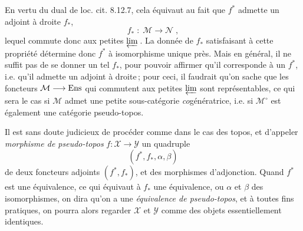 En vertu du dual de loc. cit. 8.12.7, cela équivaut au fait que $f^*$ admette un adjoint à droite $f_*$,
\[
f_* \;:\; \mathcal{M} \longrightarrow \mathcal{N}\;,
\tag*{(4.1.2)}
\]
lequel commute donc aux petites $\varprojlim$\,. La donnée de $f_*$ satisfaisant à cette propriété détermine donc $f^*$ à isomorphisme unique près. Mais en général, il ne suffit pas de se donner un tel $f_*$, pour pouvoir affirmer qu'il corresponde à un $f^*$, i.e. qu'il admette un adjoint à droite\,; pour ceci, il faudrait qu'on sache que les foncteurs $\mathcal{M}\longrightarrow\mathrm{Ens}$ qui commutent aux petites $\varprojlim$ sont représentables, ce qui sera le cas si $\mathcal{M}$ admet une petite sous-catégorie \textit{co}génératrice, i.e. si $\mathcal{M}^\circ$ est également une catégorie pseudo-topos. %

\newpage


Il est sans doute judicieux de procéder comme dans le cas des topos, et d'appeler \textit{morphisme de pseudo-topos} $f:\mathcal{X}\longrightarrow\mathcal{Y}$ un quadruple
\[
(f^*,f_*,\alpha,\beta)
\tag*{(4.1.3)}
\]
de deux foncteurs adjoints $(f^*,f_*)$, et des morphismes d'adjonction. Quand $f^*$ est une équivalence, ce qui équivaut à $f_*$ une équivalence, ou $\alpha$ et $\beta$ des isomorphismes, on dira qu'on a une \textit{équivalence de pseudo-topos}, et à toutes fins pratiques, on pourra alors regarder $\mathcal{X}$ et $\mathcal{Y}$ comme des objets essentiellement identiques.

